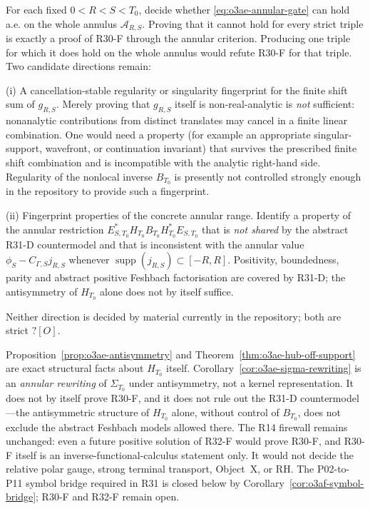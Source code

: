 \begin{openproblem}
\label{open:o3ae-analytic-gap}
For each fixed \(0<R<S<T_0\), decide whether
\eqref{eq:o3ae-annular-gate} can hold a.e. on the whole annulus
\(\mathcal A_{R,S}\).  Proving that it cannot hold for every strict triple is exactly a
proof of R30-F through the annular criterion.  Producing one triple for which it does
hold on the whole annulus would refute R30-F for that triple.  Two candidate directions
remain:

(i) A cancellation-stable regularity or singularity fingerprint for the finite shift
sum of \(g_{R,S}\).  Merely proving that \(g_{R,S}\) itself is non-real-analytic is
\emph{not} sufficient: nonanalytic contributions from distinct translates may cancel in
a finite linear combination.  One would need a property (for example an appropriate
singular-support, wavefront, or continuation invariant) that survives the prescribed
finite shift combination and is incompatible with the analytic right-hand side.
Regularity of the nonlocal inverse \(B_{T_0}\) is presently not controlled strongly
enough in the repository to provide such a fingerprint.

(ii) Fingerprint properties of the concrete annular range.  Identify a property of the
annular restriction
\(E_{S,T_0}^*H_{T_0}B_{T_0}H_{T_0}^*E_{S,T_0}\) that is
\emph{not shared} by the abstract R31-D countermodel and that is inconsistent with the
annular value \(\phi_S-C_{\Gamma,S}j_{R,S}\) whenever
\(\operatorname{supp}(j_{R,S})\subset[-R,R]\).  Positivity, boundedness, parity and
abstract positive Feshbach factorisation are covered by R31-D; the antisymmetry of
\(H_{T_0}\) alone does not by itself suffice.

Neither direction is decided by material currently in the repository; both are strict
\(?[O]\).
\end{openproblem}

\begin{remark}[Firewall]
\label{rem:o3ae-firewall}
Proposition~\ref{prop:o3ae-antisymmetry} and Theorem~\ref{thm:o3ae-hub-off-support}
are exact structural facts about \(H_{T_0}\) itself.  Corollary~\ref{cor:o3ae-sigma-rewriting}
is an \emph{annular rewriting} of \(\Sigma_{T_0}\) under antisymmetry, not a kernel
representation.  It does not by itself prove R30-F, and it does not rule out the R31-D
countermodel---the antisymmetric structure of \(H_{T_0}\) alone, without control of
\(B_{T_0}\), does not exclude the abstract Feshbach models allowed there.  The R14
firewall remains unchanged: even a future positive solution of R32-F would prove R30-F,
and R30-F itself is an inverse-functional-calculus statement only.  It would not decide
the relative polar gauge, strong terminal transport, Object~X, or RH.  The P02-to-P11
symbol bridge required in R31 is closed below by Corollary~\ref{cor:o3af-symbol-bridge};
R30-F and R32-F remain open.
\end{remark}